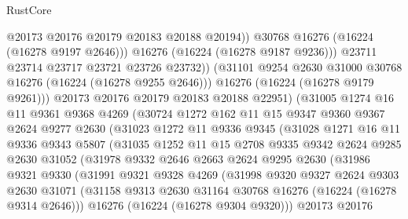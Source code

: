 \begin{lexlean}{RustCore}
\begin{coremodule}
                          @20173
                          @20176
                          @20179
                          @20183
                          @20188
                          @20194))
                      @30768
                      @16276
                      (@16224 (@16278 @9197 @2646)))
                    @16276
                    (@16224 (@16278 @9187 @9236)))
                  @23711
                  @23714
                  @23717
                  @23721
                  @23726
                  @23732))
              (@31101 @9254 @2630 @31000 @30768 @16276 (@16224 (@16278 @9255 @2646)))
              @16276
              (@16224 (@16278 @9179 @9261)))
            @20173
            @20176
            @20179
            @20183
            @20188
            @22951)
          (@31005
            @1274
            @16
            @11
            @9361
            @9368
            @4269
            (@30724
              @1272
              @162
              @11
              @15
              @9347
              @9360
              @9367
              @2624
              @9277
              @2630
              (@31023
                @1272
                @11
                @9336
                @9345
                (@31028
                  @1271
                  @16
                  @11
                  @9336
                  @9343
                  @5807
                  (@31035
                    @1252
                    @11
                    @15
                    @2708
                    @9335
                    @9342
                    @2624
                    @9285
                    @2630
                    @31052
                    (@31978
                      @9332
                      @2646
                      @2663
                      @2624
                      @9295
                      @2630
                      (@31986
                        @9321
                        @9330
                        (@31991
                          @9321
                          @9328
                          @4269
                          (@31998
                            @9320
                            @9327
                            @2624
                            @9303
                            @2630
                            @31071
                            (@31158 @9313 @2630 @31164 @30768 @16276 (@16224 (@16278 @9314 @2646)))
                            @16276
                            (@16224 (@16278 @9304 @9320)))
                          @20173
                          @20176

\end{coremodule}
\end{lexlean}
